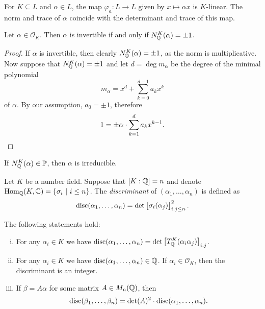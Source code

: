 \begin{opomba}
For $K \subseteq L$ and $\alpha \in L$, the map
$\varphi_a \colon L \to L$ given by $x \mapsto \alpha x$ is
$K$-linear. The norm and trace of $\alpha$ coincide with the
determinant and trace of this map.
\end{opomba}

\begin{lema}
Let $\alpha \in \mathcal{O}_K$. Then $\alpha$ is invertible
if and only if $N_{\mathbb{Q}}^K(\alpha) = \pm 1$.
\end{lema}

\begin{proof}
If $\alpha$ is invertible, then clearly $N_{\mathbb{Q}}^K(\alpha) = \pm 1$,
as the norm is multiplicative. Now suppose that
$N_{\mathbb{Q}}^K(\alpha) = \pm 1$ and let $d = \deg m_\alpha$ be the degree
of the minimal polynomial
\[
m_\alpha = x^d + \sum_{k=0}^{d-1} a_k x^k
\]
of $\alpha$. By our assumption, $a_0 = \pm 1$, therefore
\[
1 = \pm \alpha \cdot \sum_{k=1}^d a_k x^{k-1}. \qedhere
\]
\end{proof}

\begin{opomba}
If $N_{\mathbb{Q}}^K(\alpha) \in \mathbb{P}$, then $\alpha$ is irreducible.
\end{opomba}

\begin{definicija}
Let $K$ be a number field. Suppose that $[K : \mathbb{Q}] = n$ and denote
$\operatorname{Hom}_{\mathbb{Q}}(K, \mathbb{C}) = \left\{\sigma_i~\middle\vert~i \leq n\right\}$. The
\emph{discriminant} of
$(\alpha_1, \dots, \alpha_n)$ is defined as
\[
\operatorname{disc}(\alpha_1, \dots, \alpha_n) =
\det
\begin{bmatrix}
\sigma_i(\alpha_j)
\end{bmatrix}_{i, j \leq n}^2.
\]
\end{definicija}

\begin{trditev}
The following statements hold:

\begin{enumerate}[i)]
\item For any $\alpha_i \in K$ we have
$\operatorname{disc}(\alpha_1, \dots, \alpha_n) =
\det
\begin{bmatrix}
T_{\mathbb{Q}}^K(\alpha_i \alpha_j)
\end{bmatrix}_{i,j}$.
\item For any $\alpha_i \in K$ we have
$\operatorname{disc}(\alpha_1, \dots, \alpha_n) \in \mathbb{Q}$. If
$\alpha_i \in \mathcal{O}_K$, then the discriminant is an integer.
\item If $\beta = A \alpha$ for some matrix $A \in M_n(\mathbb{Q})$, then
\[
\operatorname{disc}(\beta_1, \dots, \beta_n) =
\det(A)^2 \cdot \operatorname{disc}(\alpha_1, \dots, \alpha_n).
\]
\end{enumerate}
\end{trditev}

